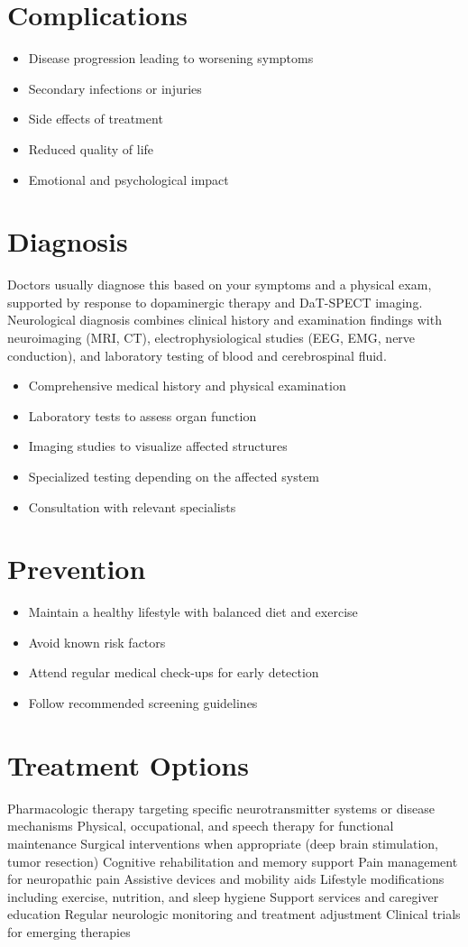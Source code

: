 \section{Complications}
\begin{itemize}[noitemsep]
  \item Disease progression leading to worsening symptoms
  \item Secondary infections or injuries
  \item Side effects of treatment
  \item Reduced quality of life
  \item Emotional and psychological impact
\end{itemize}
\section{Diagnosis}
Doctors usually diagnose this based on your symptoms and a physical exam, supported by response to dopaminergic therapy and DaT-SPECT imaging. Neurological diagnosis combines clinical history and examination findings with neuroimaging (MRI, CT), electrophysiological studies (EEG, EMG, nerve conduction), and laboratory testing of blood and cerebrospinal fluid.

\begin{itemize}[noitemsep]
  \item Comprehensive medical history and physical examination
  \item Laboratory tests to assess organ function
  \item Imaging studies to visualize affected structures
  \item Specialized testing depending on the affected system
  \item Consultation with relevant specialists
\end{itemize}
\section{Prevention}
\begin{itemize}[noitemsep]
  \item Maintain a healthy lifestyle with balanced diet and exercise
  \item Avoid known risk factors
  \item Attend regular medical check-ups for early detection
  \item Follow recommended screening guidelines
\end{itemize}
\section{Treatment Options}
Pharmacologic therapy targeting specific neurotransmitter systems or disease mechanisms Physical, occupational, and speech therapy for functional maintenance Surgical interventions when appropriate (deep brain stimulation, tumor resection) Cognitive rehabilitation and memory support Pain management for neuropathic pain Assistive devices and mobility aids Lifestyle modifications including exercise, nutrition, and sleep hygiene Support services and caregiver education Regular neurologic monitoring and treatment adjustment Clinical trials for emerging therapies

